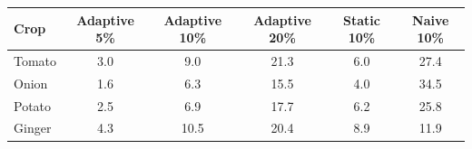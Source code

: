 \renewcommand{\arraystretch}{1.25}
\footnotesize
\begin{tabular}{|l|c|c|c|c|c|}
\hline
\textbf{Crop} & \textbf{Adaptive 5\%} & \textbf{Adaptive 10\%} & \textbf{Adaptive 20\%} & \textbf{Static 10\%} & \textbf{Naive 10\%} \\
\hline
Tomato & 3.0 & 9.0 & 21.3 & 6.0 & 27.4 \\
\hline
Onion & 1.6 & 6.3 & 15.5 & 4.0 & 34.5 \\
\hline
Potato & 2.5 & 6.9 & 17.7 & 6.2 & 25.8 \\
\hline
Ginger & 4.3 & 10.5 & 20.4 & 8.9 & 11.9 \\
\hline
\end{tabular}
